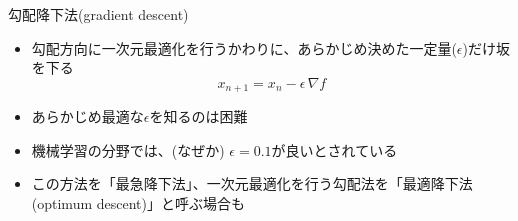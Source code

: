 \begin{frame}[t,fragile]{勾配降下法(gradient descent)}
  \begin{itemize}
  \item 勾配方向に一次元最適化を行うかわりに、あらかじめ決めた一定量($\epsilon$)だけ坂を下る
    \[
    x_{n+1} = x_n - \epsilon \, \nabla f
    \]
  \item あらかじめ最適な$\epsilon$を知るのは困難
  \item 機械学習の分野では、(なぜか) $\epsilon=0.1$が良いとされている
  \item この方法を「最急降下法」、一次元最適化を行う勾配法を「最適降下法(optimum descent)」と呼ぶ場合も
  \end{itemize}
\end{frame}
